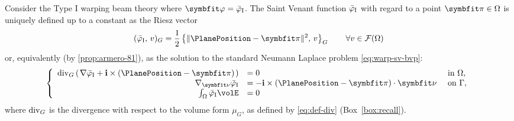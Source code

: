 Consider the Type I warping beam theory where \(\WarpAxialShapes = \WarpTwistIesan\).
The Saint Venant function \(\bar{\varphi}_{\rm I}\) with regard to a point \(\bm{\pi} \in \Section\) is uniquely defined up to a constant as the Riesz vector 
\begin{equation}
    (\WarpTwistIesan,\, v)_G =  \frac{1}{2} \left\{ \| \PlanePosition - \bm{\pi}\|^2,\, v\right\}_G %
    \qquad \forall v \in \mathcal{F}(\Section)
    \label{eq:def-sv-riesz}
\end{equation}
or, equivalently (by \cref{prop:armero-81}), as the solution to the standard Neumann Laplace problem \eqref{eq:warp-sv-bvp}:
\begin{equation}
\left\{
\begin{array}{rll}
\DivG\left(\left.\nabla \WarpTwistIesan+\FrameBasis \times(\PlanePosition-\bm{\pi})\right.\right) &=0 & \text { in } \Section, \\
\nabla_{\bm{\nu}} \WarpTwistIesan &=-\FrameBasis\times(\PlanePosition-{\bm{\pi}}) \cdot \bm{\nu} & \text { on } \SectionBoundary, \\
\int_{\Section} \WarpTwistIesan \volE &= 0
\end{array}
\right.
\end{equation}
where \(\operatorname{div}_{G}\) is the divergence with respect to the volume form \(\mu_G\), as defined by \eqref{eq:def-div} (Box~\ref{box:recall}). 


